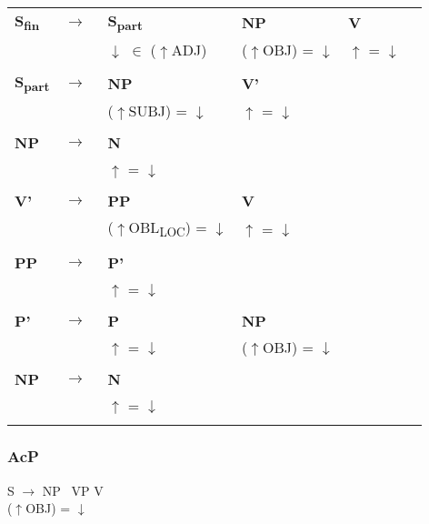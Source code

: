 \documentclass[12pt,a4paper]{article}
\begin{document}
\begin{tabular}{ l  l  l  l  l  l }
  \textbf{S\textsubscript{fin}} & $\rightarrow$ & \: \: \textbf{S\textsubscript{part}} & \: \: \textbf{NP}\label{1} & \: \textbf{V}\\
   & $\qquad$ &  $\downarrow$ $\in$ ($\uparrow$ADJ) & ($\uparrow$OBJ) = $\downarrow$ & $\uparrow$ = $\downarrow$ \\
   $\qquad$ & $\qquad$ \\
   \textbf{S\textsubscript{part}} & $\rightarrow$ & \: \: \textbf{NP} & \: \textbf{V'}\\
   & $\qquad$ & ($\uparrow$SUBJ) = $\downarrow$ & $\uparrow$ = $\downarrow$ \\
   $\qquad$ & $\qquad$ \\
    \textbf{NP} & $\rightarrow$ & \: \textbf{N} \\
   & $\qquad$ & $\uparrow$ = $\downarrow$\\
      $\qquad$ & $\qquad$ \\
    \textbf{V'} & $\rightarrow$ & \: \: \textbf{PP} & \: \: \textbf{V} & \\
   & $\qquad$ &($\uparrow$OBL\textsubscript{LOC}) = $\downarrow$  & \: $\uparrow$ = $\downarrow$\\
   $\qquad$ & $\qquad$ \\
    \textbf{PP} & $\rightarrow$ & \: \textbf{P'} \\
	& $\qquad$   & $\uparrow$ = $\downarrow$\\
   $\qquad$ & $\qquad$ \\
    \textbf{P'} & $\rightarrow$ & \: \textbf{P} & \: \: \textbf{NP} \\
   & $\qquad$ & $\uparrow$ = $\downarrow$ & ($\uparrow$OBJ) = $\downarrow$ \\
   $\qquad$ & $\qquad$ \\
    \textbf{NP} & $\rightarrow$ & \: \textbf{N} \\
   & $\qquad$ & $\uparrow$ = $\downarrow$\\
      $\qquad$ & $\qquad$ \\     
\end{tabular} 


\subsubsection{AcP}

S $\rightarrow$ NP \, VP \: V\\

($\uparrow$OBJ) = $\downarrow$\\
\end{document}
